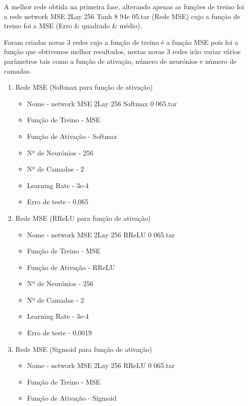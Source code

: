 \documentclass[10pt]{article}
\begin{document}
\vspace{1cm}
A melhor rede obtida na primeira fase, alterando apenas as funções de
treino foi a rede network MSE 2Lay 256 Tanh 8 94e 05.tar (Rede MSE) cujo a 
função de treino foi a MSE (Erro \& quadrado \& médio).

Foram criadas novas 3 redes cujo a função de treino é a função MSE pois foi
a função que obtivemos melhor resultados, nestas novas 3 redes irão variar vários parâmetros
tais como a função de ativação, número de neurónios e número de camadas.

\vspace{1cm}
\begin{enumerate}
  \item Rede MSE (Softmax para função de ativação)
  \begin{itemize}
    \item Nome - network MSE 2Lay 256 Softmax 0 065.tar
    \item Função de Treino - MSE
    \item Função de Ativação - Softmax
    \item Nº de Neurónios - 256
    \item Nº de Camadas - 2
    \item Learning Rate - 3e-4
    \item Erro de teste - 0,065
  \end{itemize}
  \newpage
  \item Rede MSE (RReLU para função de ativação)
  \begin{itemize}
    \item Nome - network MSE 2Lay 256 RReLU 0 065.tar
    \item Função de Treino - MSE
    \item Função de Ativação - RReLU
    \item Nº de Neurónios - 256
    \item Nº de Camadas - 2
    \item Learning Rate - 3e-4
    \item Erro de teste - 0,0019
  \end{itemize}
  \vspace{1cm}
  \item Rede MSE (Sigmoid para função de ativação)
  \begin{itemize}
    \item Nome - network MSE 2Lay 256 RReLU 0 065.tar
    \item Função de Treino - MSE
    \item Função de Ativação - Sigmoid

\end{itemize}
\end{enumerate}
\end{document}
